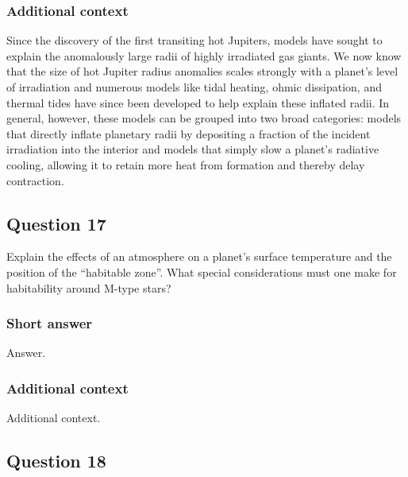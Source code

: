 \documentclass[a4paper,10pt]{article}
\begin{document}
\subsubsection{Additional context}

Since the discovery of the first transiting hot Jupiters, models have sought to explain the anomalously large radii of highly irradiated gas giants. We now know that the size of hot Jupiter radius anomalies scales strongly with a planet's level of irradiation and numerous models like tidal heating, ohmic dissipation, and thermal tides have since been developed to help explain these inflated radii. In general, however, these models can be grouped into two broad categories: models that directly inflate planetary radii by depositing a fraction of the incident irradiation into the interior and models that simply slow a planet's radiative cooling, allowing it to retain more heat from formation and thereby delay contraction.


\newpage
\subsection{Question 17}

Explain the effects of an atmosphere on a planet's surface temperature and the position of the “habitable zone”. What special considerations must one make for habitability around M-type stars?

\subsubsection{Short answer}

Answer.

\subsubsection{Additional context}

Additional context.


\newpage
\subsection{Question 18}
\end{document}
